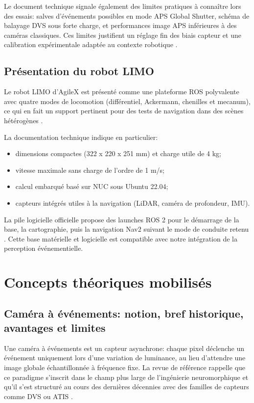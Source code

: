 Le document technique signale également des limites pratiques à connaître lors
des essais: salves d'événements possibles en mode APS Global Shutter, schéma de
balayage DVS sous forte charge, et performances image APS inférieures à des
caméras classiques. Ces limites justifient un réglage fin des biais capteur et
une calibration expérimentale adaptée au contexte robotique
\cite{davis346_datasheet}.

\subsection{Présentation du robot LIMO}
Le robot LIMO d'AgileX est présenté comme une plateforme ROS polyvalente avec
quatre modes de locomotion (différentiel, Ackermann, chenilles et mecanum), ce
qui en fait un support pertinent pour des tests de navigation dans des scènes
hétérogènes \cite{limo_ros2_doc,limo_agilex_video}.

La documentation technique indique en particulier:
\begin{itemize}
\item dimensions compactes (322 x 220 x 251 mm) et charge utile de 4 kg;
\item vitesse maximale sans charge de l'ordre de 1 m/s;
\item calcul embarqué basé sur NUC sous Ubuntu 22.04;
\item capteurs intégrés utiles à la navigation (LiDAR, caméra de profondeur,
IMU).
\end{itemize}

La pile logicielle officielle propose des launches ROS 2 pour le démarrage de
la base, la cartographie, puis la navigation Nav2 suivant le mode de conduite
retenu \cite{limo_ros2_doc}. Cette base matérielle et logicielle est
compatible avec notre intégration de la perception événementielle.

\section{Concepts théoriques mobilisés}

\subsection{Caméra à événements: notion, bref historique, avantages et limites}
Une caméra à événements est un capteur asynchrone: chaque pixel déclenche un
événement uniquement lors d'une variation de luminance, au lieu d'attendre une
image globale échantillonnée à fréquence fixe. La revue de référence rappelle
que ce paradigme s'inscrit dans le champ plus large de l'ingénierie
neuromorphique et qu'il s'est structuré au cours des dernières décennies avec
des familles de capteurs comme DVS ou ATIS \cite{novoa2024review}.

